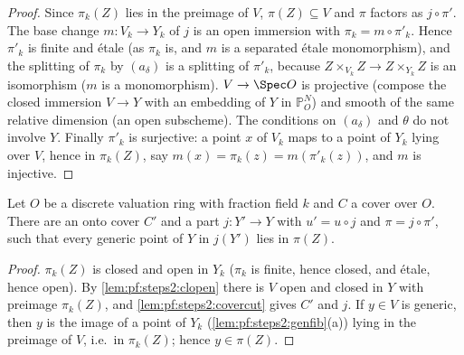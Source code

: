 \begin{proof}
Since $\pi_k(Z)$ lies in the preimage of $V$, $\pi(Z)\subseteq V$ and $\pi$ factors as $j\circ\pi'$.
The base change $m\colon V_k\to Y_k$ of $j$ is an open immersion with $\pi_k=m\circ\pi'_k$. Hence
$\pi'_k$ is finite and \'etale (as $\pi_k$ is, and $m$ is a separated \'etale monomorphism), and
the splitting of $\pi_k$ by $(a_\delta)$ is a splitting of $\pi'_k$, because
$Z\times_{V_k}Z\to Z\times_{Y_k}Z$ is an isomorphism ($m$ is a monomorphism). $V\to\Spec O$ is
projective (compose the closed immersion $V\to Y$ with an embedding of $Y$ in $\mathbb P^N_O$) and
smooth of the same relative dimension (an open subscheme). The conditions on $(a_\delta)$ and
$\theta$ do not involve $Y$. Finally $\pi'_k$ is surjective: a point $x$ of $V_k$ maps to a point of
$Y_k$ lying over $V$, hence in $\pi_k(Z)$, say $m(x)=\pi_k(z)=m(\pi'_k(z))$, and $m$ is injective.
\end{proof}

\begin{lemma}\label{lem:pf:steps2:cut}
Let $O$ be a discrete valuation ring with fraction field $k$ and $C$ a cover over $O$. There are an
onto cover $C'$ and a part $j\colon Y'\to Y$ with $u'=u\circ j$ and $\pi=j\circ\pi'$, such that every
generic point of $Y$ in $j(Y')$ lies in $\pi(Z)$.
\end{lemma}

\begin{proof}
$\pi_k(Z)$ is closed and open in $Y_k$ ($\pi_k$ is finite, hence closed, and \'etale, hence open).
By \cref{lem:pf:steps2:clopen} there is $V$ open and closed in $Y$ with preimage $\pi_k(Z)$, and
\cref{lem:pf:steps2:covercut} gives $C'$ and $j$. If $y\in V$ is generic, then $y$ is the image of a
point of $Y_k$ (\cref{lem:pf:steps2:genfib}(a)) lying in the preimage of $V$, i.e.\ in $\pi_k(Z)$;
hence $y\in\pi(Z)$.
\end{proof}

